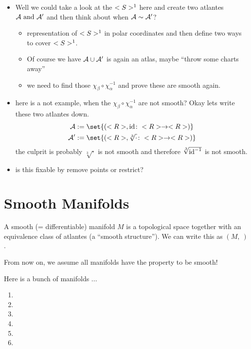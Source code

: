 \begin{example}
	\begin{itemize}
		\item Well we could take a look at the $\SS^1$ here and create two atlantes $\AA\nd \AA'$ and then think about when $\AA \sim \AA'$?
		\begin{itemize}
			\item representation of $\SS^1$ in polar coordinates and then define two ways to cover $\SS^1$.
			\item Of course we have $\AA \cup \AA'$ is again an atlas, maybe ``throw some charts away''
			\item we need to find those $\chi_{\beta} \circ \chi_{\alpha}^{-1}$ and prove these are smooth again. %
			
		\end{itemize}
		\item here is a not example, when the $\chi_{\beta} \circ \chi_{\alpha}^{-1}$ are not smooth? 
		Okay lets write these two atlantes down.
		\begin{align*}
			\AA &:= \set{(\R, \id \colon \R \to \R)}\\
			\AA' &:= \set{(\R, \sqrt[3]{\cdot}\colon \R \to \R)}
		\end{align*}
		the culprit is probably $\sqrt[3]{\cdot}$ is not smooth and therefore $\sqrt[3]{\id^{-1}}$ is not smooth. %
		\item is this fixable by remove points or restrict?
	\end{itemize}
\end{example}
\section{Smooth Manifolds}
\begin{definition}
	A smooth (= differentiable) manifold $M$ is a topological space together with an equivalence class of atlantes (a ``smooth structure''). We can write this as $(M,~)$.
\end{definition}
From now on, we assume all manifolds have the property to be smooth!
\begin{example}
	Here is a bunch of manifolds ... %
	\begin{enumerate}
		\item 
		\item 
		\item 
		\item 
		\item 
		\item 
	\end{enumerate}
\end{example}
